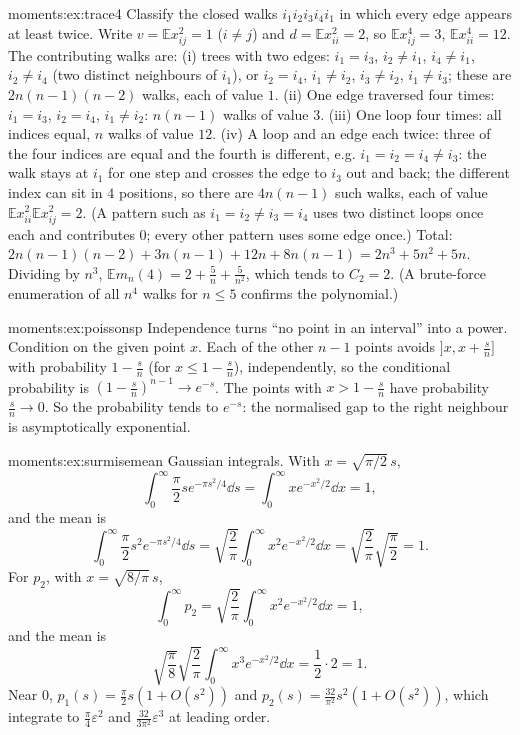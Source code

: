\begin{solution}{moments:ex:trace4}
\idea Classify the closed walks $i_1i_2i_3i_4i_1$ in which every edge appears at least twice.
\writeup Write $v=\mathbb E x_{ij}^2=1$ ($i\ne j$) and $d=\mathbb Ex_{ii}^2=2$, so $\mathbb Ex_{ij}^4=3$, $\mathbb Ex_{ii}^4=12$. The contributing walks are:
(i) trees with two edges: $i_1=i_3$, $i_2\ne i_1$, $i_4\ne i_1$, $i_2\ne i_4$ (two distinct neighbours of $i_1$), or $i_2=i_4$, $i_1\ne i_2$, $i_3\ne i_2$, $i_1\ne i_3$;
these are $2n(n-1)(n-2)$ walks, each of value $1$. (ii) One edge traversed four times: $i_1=i_3$, $i_2=i_4$, $i_1\ne i_2$: $n(n-1)$ walks of value $3$.
(iii) One loop four times: all indices equal, $n$ walks of value $12$. (iv) A loop and an edge each twice: three of the four indices are equal and the fourth is different, e.g. $i_1=i_2=i_4\ne i_3$: the walk stays at
$i_1$ for one step and crosses the edge to $i_3$ out and back; the different index can sit in $4$ positions, so there are $4n(n-1)$ such walks, each of
value $\mathbb Ex_{ii}^2\mathbb Ex_{ij}^2=2$. (A pattern such as $i_1=i_2\ne i_3=i_4$ uses two distinct loops once each and contributes $0$; every other
pattern uses some edge once.) Total:
$2n(n-1)(n-2)+3n(n-1)+12n+8n(n-1)=2n^3+5n^2+5n$. Dividing by $n^3$, $\mathbb Em_n(4)=2+\frac5n+\frac5{n^2}$, which tends to $C_2=2$.
(A brute-force enumeration of all $n^4$ walks for $n\le5$ confirms the polynomial.)
\end{solution}

\begin{solution}{moments:ex:poissonsp}
\idea Independence turns ``no point in an interval'' into a power.
\writeup Condition on the given point $x$. Each of the other $n-1$ points avoids $]x,x+\frac sn]$ with probability $1-\frac sn$ (for $x\le1-\frac sn$), independently,
so the conditional probability is $(1-\frac sn)^{n-1}\to e^{-s}$. The points with $x>1-\frac sn$ have probability $\frac sn\to0$. So the probability tends to $e^{-s}$:
the normalised gap to the right neighbour is asymptotically exponential.
\end{solution}

\begin{solution}{moments:ex:surmisemean}
\idea Gaussian integrals.
\writeup With $x=\sqrt{\pi/2}\,s$,
\[
\int_0^\infty\frac\pi2se^{-\pi s^2/4}\dd s=\int_0^\infty xe^{-x^2/2}\dd x=1,
\]
and the mean is
\[
\int_0^\infty\frac\pi2s^2e^{-\pi s^2/4}\dd s=\sqrt{\frac2\pi}\int_0^\infty x^2e^{-x^2/2}\dd x=\sqrt{\frac2\pi}\sqrt{\frac\pi2}=1.
\]
For $p_2$, with $x=\sqrt{8/\pi}\,s$,
\[
\int_0^\infty p_2=\sqrt{\frac2\pi}\int_0^\infty x^2e^{-x^2/2}\dd x=1,
\]
and the mean is
\[
\sqrt{\frac\pi8}\sqrt{\frac2\pi}\int_0^\infty x^3e^{-x^2/2}\dd x=\frac12\cdot2=1.
\]
Near $0$,
$p_1(s)=\frac\pi2s(1+O(s^2))$ and $p_2(s)=\frac{32}{\pi^2}s^2(1+O(s^2))$, which integrate to $\frac\pi4\varepsilon^2$ and $\frac{32}{3\pi^2}\varepsilon^3$ at leading order.
\end{solution}

